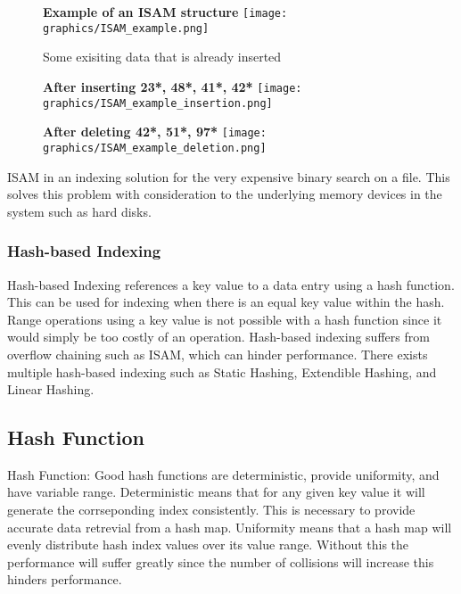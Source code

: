 \documentclass[letterpaper, 12pt]{article}
\begin{document}
\begin{figure}
  \centering
  \textbf{Example of an ISAM structure}
  \texttt{[image: graphics/ISAM\_example.png]}
  \caption{Some exisiting data that is already inserted}
\end{figure}

\begin{figure}
  \centering
  \textbf{After inserting 23*, 48*, 41*, 42*}
  \texttt{[image: graphics/ISAM\_example\_insertion.png]}
\end{figure}

\begin{figure}
  \centering
  \textbf{After deleting 42*, 51*, 97*}
  \texttt{[image: graphics/ISAM\_example\_deletion.png]}
\end{figure}

\par\vspace{\baselineskip}

ISAM in an indexing solution for the very expensive binary search on a file. This solves this
problem with consideration to the underlying memory devices in the system such as hard disks.

\subsubsection{Hash-based Indexing}
Hash-based Indexing references a key value to a data entry using a hash function. This can be
used for indexing when there is an equal key value within the hash. Range operations using
a key value is not possible with a hash function since it would simply be too costly of an
operation. Hash-based indexing suffers from overflow chaining such as ISAM, which can hinder
performance. There exists multiple hash-based indexing such as Static Hashing, Extendible Hashing,
and Linear Hashing.
\subsection{Hash Function}
Hash Function:
Good hash functions are deterministic, provide uniformity, and have variable range. Deterministic means
that for any given key value it will generate the corrseponding index consistently. This is
necessary to provide accurate data retrevial from a hash map. Uniformity means that a hash
map will evenly distribute hash index values over its value range. Without this the
performance will suffer greatly since the number of collisions will increase this hinders performance.
\end{document}
